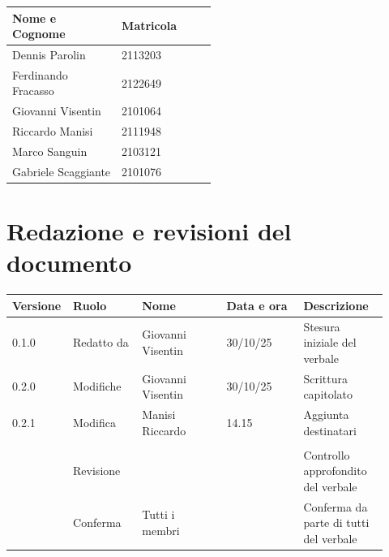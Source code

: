 \documentclass[a4paper,12pt]{article}
\begin{document}
\begin{center}
\small
\renewcommand{\arraystretch}{1.2}
\begin{tabular}{|p{0.3\linewidth}|p{0.2\linewidth}|}
\hline
\rowcolor{gray!60}
\textbf{Nome e Cognome} & \textbf{Matricola} \\
\hline
Dennis Parolin & 2113203 \\
\hline
Ferdinando Fracasso & 2122649 \\
\hline
Giovanni Visentin & 2101064 \\
\hline
Riccardo Manisi & 2111948 \\
\hline
Marco Sanguin & 2103121 \\
\hline
Gabriele Scaggiante & 2101076 \\
\hline
\end{tabular}
\end{center}

\clearpage
\section{Redazione e revisioni del documento}

\begin{center}
\small
\renewcommand{\arraystretch}{1.2} 
\begin{tabular}{|p{0.1\linewidth}|p{0.18\linewidth}|p{0.22\linewidth}|p{0.20\linewidth}|p{0.22\linewidth}|}
\hline
\rowcolor{gray!60} 
\textbf{Versione} & \textbf{Ruolo} & \textbf{Nome} & \textbf{Data e ora} & \textbf{Descrizione} \\
\hline
\rowcolor{white}
0.1.0 & Redatto da & Giovanni Visentin & 30/10/25 & Stesura iniziale del verbale \\
\hline
\rowcolor{gray!20}
0.2.0 & Modifiche & Giovanni Visentin & 30/10/25 &  Scrittura capitolato\\
\hline
\rowcolor{white}
0.2.1 & Modifica & Manisi Riccardo & 14.15 & Aggiunta destinatari \\
\hline
\rowcolor{gray!20}
 &  &  &  &  \\
\hline
\rowcolor{white}
 & Revisione &  &  & Controllo approfondito del verbale \\
\hline
\rowcolor{gray!20}
 & Conferma & Tutti i membri &  & Conferma da parte di tutti del verbale \\
\hline

\end{tabular}
\end{center}
\end{document}
